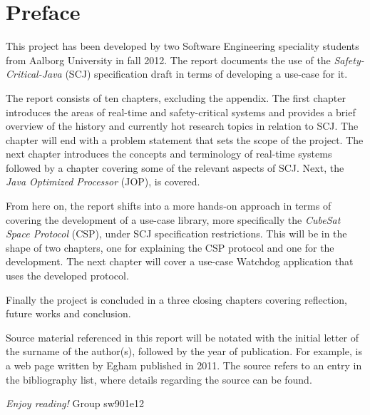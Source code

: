 \newpage
\thispagestyle{empty}
\mbox{}

\chapter*{Preface}
This project has been developed by two Software Engineering speciality students from Aalborg University in fall 2012. The report documents the use of the \textit{Safety-Critical-Java} (SCJ) specification draft in terms of developing a use-case for it.

\vspace{4mm}
\noindent The report consists of ten chapters, excluding the appendix. The first chapter introduces the areas of real-time and safety-critical systems and provides a brief overview of the history and currently hot research topics in relation to SCJ. The chapter will end with a problem statement that sets the scope of the project. The next chapter introduces the concepts and terminology of real-time systems followed by a chapter covering some of the relevant aspects of SCJ. Next, the \textit{Java Optimized Processor} (JOP), is covered. 

From here on, the report shifts into a more hands-on approach in terms of covering the development of a use-case library, more specifically the \textit{CubeSat Space Protocol} (CSP), under SCJ specification restrictions. This will be in the shape of two chapters, one for explaining the CSP protocol and one for the development. The next chapter will cover a use-case Watchdog application that uses the developed protocol.

Finally the project is concluded in a three closing chapters covering reflection, future works and conclusion. 

\vspace{4mm}
\noindent Source material referenced in this report will be notated with the initial letter of the surname of the author(s), followed by the year of publication. For example, is a web page written by Egham published in 2011. The source refers to an entry in the bibliography list, where details regarding the source can be found.

\vspace{5mm}
	\begin{flushright}
\emph{Enjoy reading!} Group sw901e12
	\end{flushright}

\newpage
